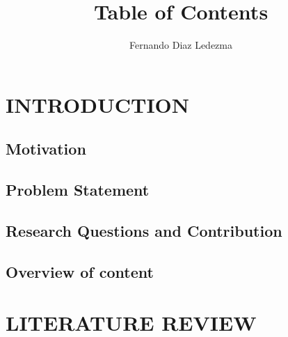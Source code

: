 \documentclass{article}
\title{Table of Contents}
\author{Fernando Diaz Ledezma}
\date{ }
\begin{document}
	
	\maketitle
	
	\tableofcontents
	
\section{INTRODUCTION}
\subsection{Motivation}
\subsection{Problem Statement}
\subsection{Research Questions and Contribution}
\subsection{Overview of content}

\section{LITERATURE REVIEW}
\end{document}
